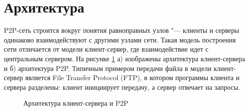 \documentclass[bachelor, och, coursework]{SCWorks}
\begin{document}
\section{Архитектура} 
P2P-сеть строится вокруг понятия равноправных узлов "--- клиенты и серверы одинаково взаимодействуют с другими узлами сети. 
Такая модель построения сети отличается от модели клиент-сервер, где взаимодействие идет с центральным сервером. 
На рисунке \ref{image1} а) изображены архитектура клиент-сервера и б) архитектура P2P. 
Типичным примером передачи файла в модели клиент-сервер является File Transfer Protocol (FTP), 
в котором программы клиента и сервера разделены: клиент инициирует передачу, а сервер отвечает на запросы. 

\begin{figure}[h]
    \begin{minipage}[h]{0.49\linewidth}
    \end{minipage}
    \hfill
    \begin{minipage}[h]{0.49\linewidth}
    \end{minipage}
    \caption{Архитектура клиент-сервера и P2P}
    \label{image1}
\end{figure}
\end{document}
